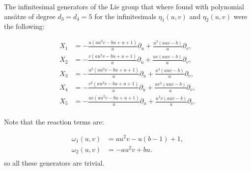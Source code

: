 The infinitesimal generators of the Lie group that where found with polynomial ans\"atze of degree $d_3=d_4=5$ for the infinitesimals $\eta_1(u,v)$ and $\eta_2(u,v)$ were the following:

\begin{align*}
X_{1}&=- \frac{u \left(a u^{2} v - b u + u + 1\right)}{a}\partial_u+\frac{u^{2} \left(a u v - b\right)}{a}\partial_v,\\
X_{2}&=- \frac{v \left(a u^{2} v - b u + u + 1\right)}{a}\partial_u+\frac{u v \left(a u v - b\right)}{a}\partial_v,\\
X_{3}&=- \frac{u^{2} \left(a u^{2} v - b u + u + 1\right)}{a}\partial_u+\frac{u^{3} \left(a u v - b\right)}{a}\partial_v,\\
X_{4}&=- \frac{v^{2} \left(a u^{2} v - b u + u + 1\right)}{a}\partial_u+\frac{u v^{2} \left(a u v - b\right)}{a}\partial_v,\\
X_{5}&=- \frac{u v \left(a u^{2} v - b u + u + 1\right)}{a}\partial_u+\frac{u^{2} v \left(a u v - b\right)}{a}\partial_v.\\
\end{align*}


Note that the reaction terms are:




\begin{align*}
\omega_1(u,v)&=a u^{2} v - u \left(b - 1\right) + 1,\\
\omega_2(u,v)&=- a u^{2} v + b u.\\
\end{align*}
so all these generators are trivial.


